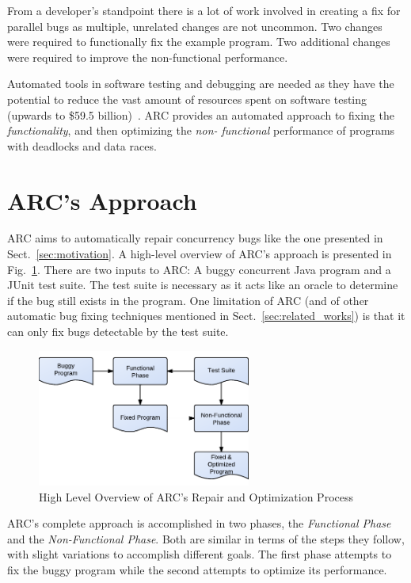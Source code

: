 \documentclass{llncs}
\begin{document}
From a developer's standpoint there is a lot of work involved in creating a fix
for parallel bugs as multiple, unrelated changes are not uncommon. Two changes
were required to functionally fix the example program. Two additional changes
were required to improve the non-functional performance.

Automated tools in software testing and debugging are needed as they have the
potential to reduce the vast amount of resources spent on software testing
(upwards to \$59.5 billion)~\cite{RTI02}. ARC provides an automated approach to
fixing the \textit{functionality}, and then optimizing the \textit{non-
functional} performance of programs with deadlocks and data races.

\section{ARC's Approach}
\label{sec:approach}

ARC aims to automatically repair concurrency bugs like the one presented in
Sect.~\ref{sec:motivation}. A high-level overview of ARC's approach is
presented in Fig.~\ref{fig:process}. There are two inputs to ARC: A buggy
concurrent Java program and a JUnit test suite. The test suite is necessary as
it acts like an oracle to determine if the bug still exists in the program. One
limitation of ARC (and of other automatic bug fixing techniques mentioned in
Sect.~\ref{sec:related_works}) is that it can only fix bugs detectable by the
test suite.

\begin{figure}[h]
  \centering
  \includegraphics[width=7.0cm]{figures/process.pdf}
  \caption{High Level Overview of ARC's Repair and Optimization Process}
  \label{fig:process}
\end{figure}

ARC's complete approach is accomplished in two phases, the \textit{Functional
Phase} and the \textit{Non-Functional Phase}. Both are similar in terms of the
steps they follow, with slight variations to accomplish different goals. The
first phase attempts to fix the buggy program while the second attempts to
optimize its performance.
\end{document}
